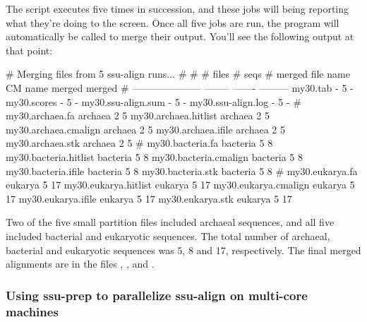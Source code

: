 
The script executes  five times in succession, and
these jobs will being reporting what they're doing to the screen. 
Once all five jobs are run, the  program will
automatically be called to merge their output. You'll see the
following output at that point:

\begin{sreoutput}
# Merging files from 5 ssu-align runs...
#
#                                  # files     # seqs
# merged file name       CM name    merged     merged
# ---------------------  --------  -------  ---------
  my30.tab               -               5          -
  my30.scores            -               5          -
  my30.ssu-align.sum     -               5          -
  my30.ssu-align.log     -               5          -
#
  my30.archaea.fa        archaea         2          5
  my30.archaea.hitlist   archaea         2          5
  my30.archaea.cmalign   archaea         2          5
  my30.archaea.ifile     archaea         2          5
  my30.archaea.stk       archaea         2          5
#
  my30.bacteria.fa       bacteria        5          8
  my30.bacteria.hitlist  bacteria        5          8
  my30.bacteria.cmalign  bacteria        5          8
  my30.bacteria.ifile    bacteria        5          8
  my30.bacteria.stk      bacteria        5          8
#
  my30.eukarya.fa        eukarya         5         17
  my30.eukarya.hitlist   eukarya         5         17
  my30.eukarya.cmalign   eukarya         5         17
  my30.eukarya.ifile     eukarya         5         17
  my30.eukarya.stk       eukarya         5         17
\end{sreoutput}

Two of the five small partition files included archaeal sequences, and
all five included bacterial and eukaryotic  sequences. The total number
of archaeal, bacterial and eukaryotic sequences was 5, 8 and 17,
respectively. The final merged alignments are in the files
, , and
.

\subsubsection{Using ssu-prep to parallelize ssu-align
  on multi-core machines}

